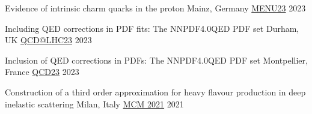 \begin{cvhonors}

    \cvhonor
    {Evidence of intrinsic charm quarks in the proton} %
    {Mainz, Germany}
    {\href{https://indico.him.uni-mainz.de/event/171/contributions/1438/}{MENU23}} %
    {2023}

    \cvhonor
    {Including QED corrections in PDF fits: The NNPDF4.0QED PDF set} %
    {Durham, UK}
    {\href{https://conference.ippp.dur.ac.uk/event/1128/contributions/6473/}{QCD@LHC23}} %
    {2023}

    \cvhonor
    {Inclusion of QED corrections in PDFs: The NNPDF4.0QED PDF set} %
    {Montpellier, France}
    {\href{https://qcd23.sciencesconf.org/}{QCD23}} %
    {2023}

    \cvhonor
    {Construction of a third order approximation for heavy flavour production in deep inelastic scattering} %
    {Milan, Italy}
    {\vspace{0.35cm}\href{https://indico.cern.ch/event/1095418/contributions/4656984/}{MCM 2021}} %
    {\vspace{0.35cm}2021}
    
    


\end{cvhonors}